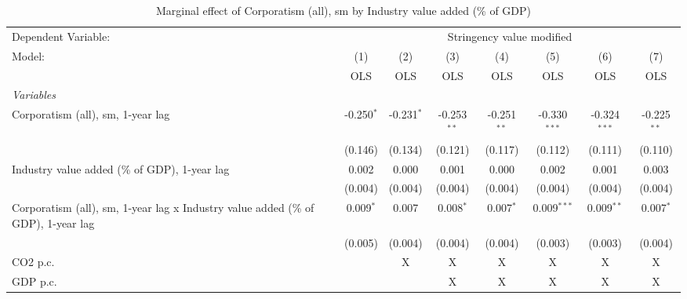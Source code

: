 
\begin{table}[htbp]
   \caption{Marginal effect of Corporatism (all), sm by Industry value added (\% of GDP)}
   \centering
   \begin{tabular}{lccccccc}
      \toprule
      Dependent Variable: & \multicolumn{7}{c}{Stringency value modified}\\
      Model:                                                                            & (1)          & (2)          & (3)           & (4)           & (5)            & (6)            & (7)\\  
                                                                                        &  OLS         & OLS          & OLS           & OLS           & OLS            & OLS            & OLS\\  
      \midrule
      \emph{Variables}\\
      Corporatism (all), sm, 1-year lag                                                 & -0.250$^{*}$ & -0.231$^{*}$ & -0.253$^{**}$ & -0.251$^{**}$ & -0.330$^{***}$ & -0.324$^{***}$ & -0.225$^{**}$\\   
                                                                                        & (0.146)      & (0.134)      & (0.121)       & (0.117)       & (0.112)        & (0.111)        & (0.110)\\   
      Industry value added (\% of GDP), 1-year lag                                      & 0.002        & 0.000        & 0.001         & 0.000         & 0.002          & 0.001          & 0.003\\   
                                                                                        & (0.004)      & (0.004)      & (0.004)       & (0.004)       & (0.004)        & (0.004)        & (0.004)\\   
      Corporatism (all), sm, 1-year lag x Industry value added (\% of GDP), 1-year lag  & 0.009$^{*}$  & 0.007        & 0.008$^{*}$   & 0.007$^{*}$   & 0.009$^{***}$  & 0.009$^{**}$   & 0.007$^{*}$\\   
                                                                                        & (0.005)      & (0.004)      & (0.004)       & (0.004)       & (0.003)        & (0.003)        & (0.004)\\   
      CO2 p.c.                                                                          &              & X            & X             & X             & X              & X              & X\\  
      GDP p.c.                                                                          &              &              & X             & X             & X              & X              & X\\  

\end{tabular}
\end{table}

